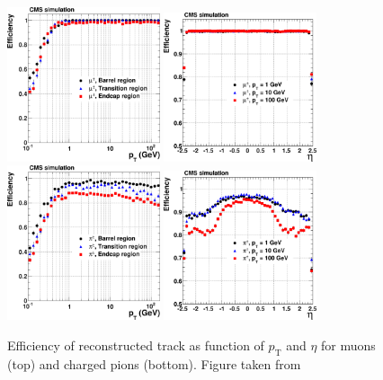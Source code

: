 \begin{figure}%
  \begin{center}
    \includegraphics[width=0.4\textwidth]{figuras/Chapter3/TrackEff_Muon_pt.png}
    \includegraphics[width=0.4\textwidth]{figuras/Chapter3/TrackEff_Muon_eta.png}\hfill
    \includegraphics[width=0.4\textwidth]{figuras/Chapter3/TrackEff_Pion_pt.png}
    \includegraphics[width=0.4\textwidth]{figuras/Chapter3/TrackEff_Pion_eta.png}
    \caption{Efficiency of reconstructed track as function of $p_{\textrm{T}}$ and $\eta$ for 
    muons (top) and charged pions (bottom). Figure taken from \cite{Chatrchyan:2014fea}}
    \label{fig:Track_Efficiencies}
  \end{center}
\end{figure}

